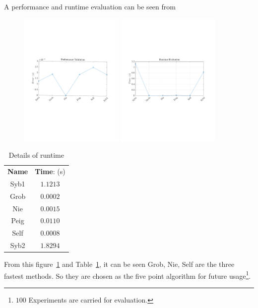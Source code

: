 A performance and runtime evaluation can be seen from
\begin{figure}
\centering
\includegraphics[width=0.45\textwidth]{hand_eye_files/vision/figures/five_point_perf}
\includegraphics[width=0.45\textwidth]{hand_eye_files/vision/figures/five_point_time}
\label{fig:ess_com}
\end{figure}
\begin{table}[h!]
\centering
\caption{Details of runtime}
\begin{tabular}{c||c}
\hline
\textbf{Name} & \textbf{Time}: (s) \\
 Syb1 & $1.1213$ \\
 Grob & $0.0002$ \\
 Nie & $0.0015$ \\
 Peig & $0.0110$ \\
 Self & $0.0008$ \\
 Syb2 & $1.8294$ \\ 
 \hline
\end{tabular}
\label{tb:ess_com}
\end{table}
From this figure~\ref{fig:ess_com} and Table~\ref{tb:ess_com}, it can be seen Grob, Nie, Self are the three fastest methods. So they are chosen as the five point algorithm for future usage\footnote{$100$ Experiments are carried for evaluation.}.